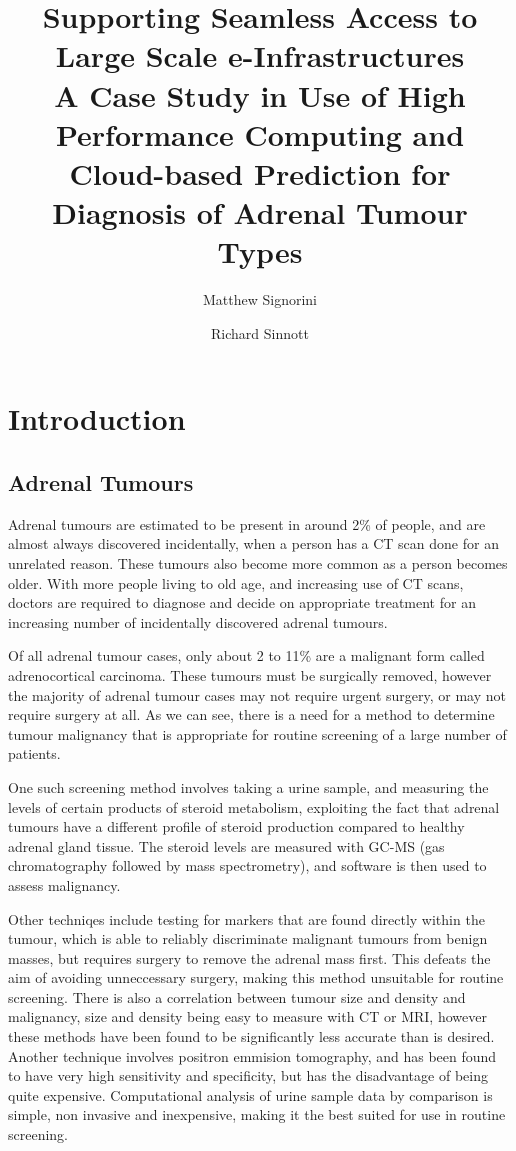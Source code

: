 \documentclass[a4paper]{article}
\title{Supporting Seamless Access to Large Scale e-Infrastructures\\ 
    \large A Case
    Study in Use of High Performance Computing and Cloud-based Prediction
    for Diagnosis of Adrenal Tumour Types}
\author{Matthew Signorini \and Richard Sinnott}
\begin{document}
\begin{titlepage}
    \maketitle

    \begin{abstract}
        \blindtext
    \end{abstract}

    \tableofcontents
\end{titlepage}


\section{Introduction}

\subsection{Adrenal Tumours}
Adrenal tumours are estimated to be present in around 2\% of people, and
are almost always discovered incidentally, when a person has a CT scan
done for an unrelated reason. These tumours also become more common as a
person becomes older. With more people living to old age, and increasing
use of CT scans, doctors are required to diagnose and decide on appropriate
treatment for an increasing number of incidentally discovered adrenal
tumours. 

Of all adrenal tumour cases, only about 2 to 11\% are a malignant form
called adrenocortical carcinoma. These tumours must be surgically
removed, however the majority of adrenal tumour cases may not require
urgent surgery, or may not require surgery at all. As we can see, there
is a need for a method to determine tumour malignancy that is appropriate
for routine screening of a large number of patients.

One such screening method involves taking a urine sample, and measuring
the levels of certain products of steroid metabolism, exploiting the fact
that adrenal tumours have a different profile of steroid production
compared to healthy adrenal gland tissue. The steroid levels are measured
with GC-MS (gas chromatography followed by mass spectrometry), and
software is then used to assess malignancy.

Other techniqes include testing for markers that are found directly within
the tumour, which is able to reliably discriminate malignant tumours from
benign masses, but requires surgery to remove the adrenal mass
first. This defeats the aim of avoiding unneccessary surgery, making this
method unsuitable for routine screening. There is also a correlation between
tumour size and density and malignancy, size and density being easy to
measure with CT or
MRI, however these methods have been found to be significantly less
accurate than is desired. Another technique involves positron emmision
tomography, and has been found to have very high sensitivity and 
specificity, but has the disadvantage of being quite expensive.
Computational analysis of urine sample data by comparison is simple, non
invasive and inexpensive, making it the best suited for use in routine
screening.
\end{document}
